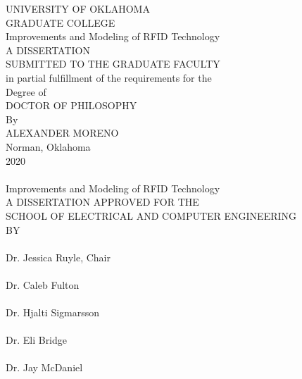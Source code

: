 \documentclass[12pt,onecolumn]{report}
\begin{document}
\centering
UNIVERSITY OF OKLAHOMA \\
GRADUATE COLLEGE \\
\vspace{5\baselineskip}
Improvements and Modeling of RFID Technology \\
\vspace{4\baselineskip}
A DISSERTATION \\
SUBMITTED TO THE GRADUATE FACULTY \\
in partial fulfillment of the requirements for the \\
Degree of \\
DOCTOR OF PHILOSOPHY\\
\vspace{5\baselineskip}
By \\
ALEXANDER MORENO \\
Norman, Oklahoma \\
2020 \\

\clearpage
~ \\ \vspace{.5in}
Improvements and Modeling of RFID Technology  \\
\vspace{2\baselineskip}
A DISSERTATION APPROVED FOR THE \\
SCHOOL OF ELECTRICAL AND COMPUTER ENGINEERING \\
\vspace{5\baselineskip}
BY \\
\vspace{6\baselineskip}
\raggedleft
\hspace*{3in}\hrulefill \\
Dr. Jessica Ruyle, Chair \\
\vspace{3\baselineskip}
\hspace*{3in}\hrulefill \\
Dr. Caleb Fulton \\
\vspace{3\baselineskip}
\hspace*{3in}\hrulefill \\
Dr. Hjalti Sigmarsson \\
\vspace{3\baselineskip}
\hspace*{3in}\hrulefill \\
Dr. Eli Bridge \\
\vspace{3\baselineskip}
\hspace*{3in}\hrulefill \\
Dr. Jay McDaniel\\
\end{document}
